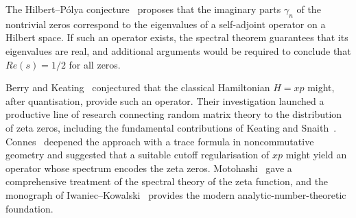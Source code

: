 \documentclass{pre-aomart}
\def\Re{Re}%
\theoremstyle{plain}
\theoremstyle{definition}
\theoremstyle{remark}
\begin{document}
The Hilbert--P\'olya conjecture~\cite{IwaniecKowalski2004,HilbertPolya1910} proposes that the
imaginary parts $\gamma_n$ of the nontrivial zeros correspond to the eigenvalues of a
self-adjoint operator on a Hilbert space.  If such an operator exists, the spectral theorem
guarantees that its eigenvalues are real, and additional arguments would be required to
conclude that $\Re(s) = 1/2$ for all zeros.

Berry and Keating~\cite{BerryKeating1999} conjectured that the classical Hamiltonian $H = xp$
might, after quantisation, provide such an operator.  Their investigation launched a productive
line of research connecting random matrix theory to the distribution of zeta zeros,
including the fundamental contributions of Keating and Snaith~\cite{KeatingSnaith2000}.
Connes~\cite{Connes1999} deepened the approach with a trace formula in noncommutative geometry
and suggested that a suitable cutoff regularisation of $xp$ might yield an operator whose
spectrum encodes the zeta zeros.  Motohashi~\cite{Motohashi1997} gave a comprehensive
treatment of the spectral theory of the zeta function, and the monograph of
Iwaniec--Kowalski~\cite{IwaniecKowalski2004} provides the modern analytic-number-theoretic
foundation.
\end{document}
